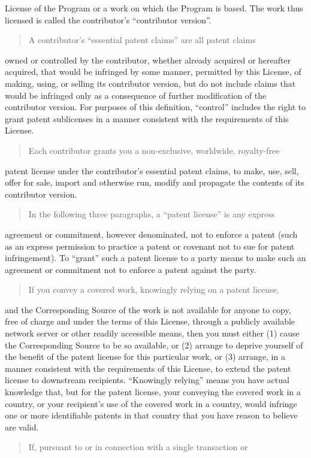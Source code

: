 \documentclass[letterpaper,10pt,english]{sphinxmanual}
\begin{document}
License of the Program or a work on which the Program is based.  The
work thus licensed is called the contributor’s “contributor version”.
\begin{quote}

A contributor’s “essential patent claims” are all patent claims
\end{quote}

owned or controlled by the contributor, whether already acquired or
hereafter acquired, that would be infringed by some manner, permitted
by this License, of making, using, or selling its contributor version,
but do not include claims that would be infringed only as a
consequence of further modification of the contributor version.  For
purposes of this definition, “control” includes the right to grant
patent sublicenses in a manner consistent with the requirements of
this License.
\begin{quote}

Each contributor grants you a non-exclusive, worldwide, royalty-free
\end{quote}

patent license under the contributor’s essential patent claims, to
make, use, sell, offer for sale, import and otherwise run, modify and
propagate the contents of its contributor version.
\begin{quote}

In the following three paragraphs, a “patent license” is any express
\end{quote}

agreement or commitment, however denominated, not to enforce a patent
(such as an express permission to practice a patent or covenant not to
sue for patent infringement).  To “grant” such a patent license to a
party means to make such an agreement or commitment not to enforce a
patent against the party.
\begin{quote}

If you convey a covered work, knowingly relying on a patent license,
\end{quote}

and the Corresponding Source of the work is not available for anyone
to copy, free of charge and under the terms of this License, through a
publicly available network server or other readily accessible means,
then you must either (1) cause the Corresponding Source to be so
available, or (2) arrange to deprive yourself of the benefit of the
patent license for this particular work, or (3) arrange, in a manner
consistent with the requirements of this License, to extend the patent
license to downstream recipients.  “Knowingly relying” means you have
actual knowledge that, but for the patent license, your conveying the
covered work in a country, or your recipient’s use of the covered work
in a country, would infringe one or more identifiable patents in that
country that you have reason to believe are valid.
\begin{quote}

If, pursuant to or in connection with a single transaction or
\end{quote}
\end{document}
